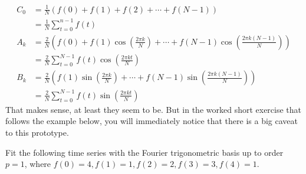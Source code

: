 \begin{subequations}
\begin{align}
C_0 &= \frac{1}{N}(f(0) + f(1) + f(2) + \cdots + f(N-1)) \nonumber \\
&= \frac{1}{N}\sum_{t=0}^{n-1} f(t) \label{eqn:protoDFTc}  \\
A_k &= \frac{2}{N}\left(f(0) + f(1)\cos(\frac{2\pi k}{N}) + \cdots + f(N-1)\cos(\frac{2\pi k(N-1)}{N})\right) \nonumber \\
&= \frac{2}{N}\sum_{t=0}^{N-1} f(t)\cos(\frac{2\pi kt}{N}) \label{eqn:protoDFTa} \\
B_k &= \frac{2}{N}\left(f(1)\sin(\frac{2\pi k}{N}) + \cdots + f(N-1)\sin(\frac{2\pi k (N-1)}{N})\right) \nonumber \\
&= \frac{2}{N}\sum_{t=0}^{N-1} f(t)\sin(\frac{2\pi kt}{N}) \label{eqn:protoDFTb}
\end{align}
\end{subequations}
That makes sense, at least they seem to be. But in the worked short exercise that follows the example below, you will immediately notice that there is a big caveat to this prototype.
\begin{exmp}
\label{exmp:ex11.2.1}
Fit the following time series with the Fourier trigonometric basis up to order $p=1$, where $f(0) = 4, f(1) = 1, f(2) = 2, f(3) = 3, f(4) = 1$.
\end{exmp}
